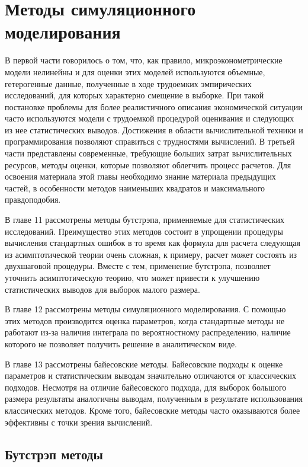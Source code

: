 
\part{Методы симуляционного моделирования}

В первой части говорилось о том, что, как правило, микроэконометрические модели нелинейны и для оценки этих моделей используются объемные, гетерогенные данные, полученные в ходе трудоемких эмпирических исследований, для которых характерно смещение в выборке. При такой постановке проблемы для более реалистичного описания экономической ситуации часто используются модели с трудоемкой процедурой оценивания и следующих из нее статистических выводов. Достижения в области вычислительной техники и программирования позволяют справиться с трудностями вычислений. В третьей части представлены современные, требующие больших затрат вычислительных ресурсов, методы оценки, которые позволяют облегчить процесс расчетов. Для освоения материала этой главы необходимо знание материала предыдущих частей, в особенности методов наименьших квадратов и максимального правдоподобия.

В главе 11 рассмотрены методы бутстрэпа, применяемые для статистических исследований. Преимущество этих методов состоит в упрощении процедуры вычисления стандартных ошибок в то время как формула для расчета следующая из асимптотической теории очень сложная, к примеру, расчет может состоять из двухшаговой процедуры. Вместе с тем, применение бутстрэпа, позволяет уточнить асимптотическую теорию, что может привести к улучшению статистических выводов для выборок малого размера.

В главе 12 рассмотрены методы симуляционного моделирования. С помощью этих методов производится оценка параметров, когда стандартные методы не работают из-за наличия интеграла по вероятностному распределению, наличие которого не позволяет получить решение в аналитическом виде.

В главе 13 рассмотрены байесовские методы. Байесовские подходы к оценке параметров и статистическим выводам значительно отличаются от классических подходов. Несмотря на отличие байесовского подхода, для выборок большого размера результаты аналогичны выводам, полученным в результате использования классических методов. Кроме того, байесовские методы часто оказываются более эффективны с точки зрения вычислений.


\chapter{Бутстрэп методы}
